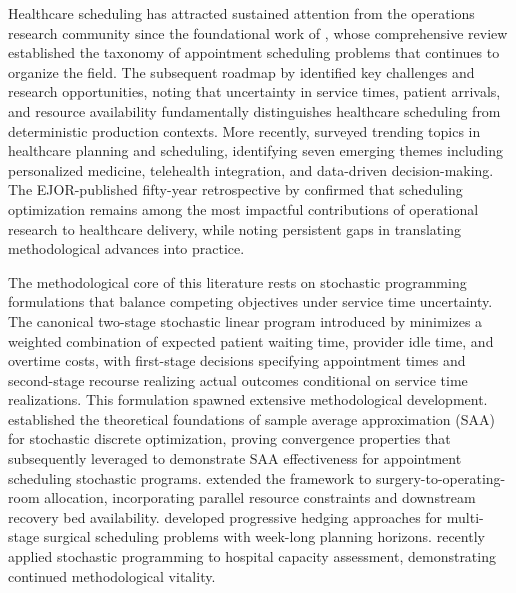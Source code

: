 \documentclass[msom,blindrev]{informs3}
\begin{document}
Healthcare scheduling has attracted sustained attention from the operations research community since the foundational work of \citet{cayirli2003outpatient}, whose comprehensive review established the taxonomy of appointment scheduling problems that continues to organize the field. The subsequent roadmap by \citet{gupta2008appointment} identified key challenges and research opportunities, noting that uncertainty in service times, patient arrivals, and resource availability fundamentally distinguishes healthcare scheduling from deterministic production contexts. More recently, \citet{youn2022planning} surveyed trending topics in healthcare planning and scheduling, identifying seven emerging themes including personalized medicine, telehealth integration, and data-driven decision-making. The EJOR-published fifty-year retrospective by \citet{belien2025fifty} confirmed that scheduling optimization remains among the most impactful contributions of operational research to healthcare delivery, while noting persistent gaps in translating methodological advances into practice.

The methodological core of this literature rests on stochastic programming formulations that balance competing objectives under service time uncertainty. The canonical two-stage stochastic linear program introduced by \citet{denton2003sequential} minimizes a weighted combination of expected patient waiting time, provider idle time, and overtime costs, with first-stage decisions specifying appointment times and second-stage recourse realizing actual outcomes conditional on service time realizations. This formulation spawned extensive methodological development. \citet{kleywegt2002sample} established the theoretical foundations of sample average approximation (SAA) for stochastic discrete optimization, proving convergence properties that \citet{mancilla2012sample} subsequently leveraged to demonstrate SAA effectiveness for appointment scheduling stochastic programs. \citet{denton2010optimal} extended the framework to surgery-to-operating-room allocation, incorporating parallel resource constraints and downstream recovery bed availability. \citet{gul2015progressive} developed progressive hedging approaches for multi-stage surgical scheduling problems with week-long planning horizons. \citet{marchesi2025stochastic} recently applied stochastic programming to hospital capacity assessment, demonstrating continued methodological vitality.
\end{document}
